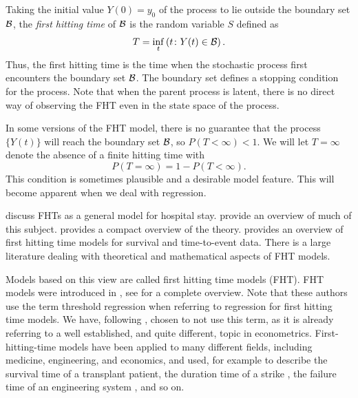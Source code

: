 Taking the initial value $Y(0)=y_0$ of the process to lie outside the boundary set $\mathcal{B}$, the \textit{first hitting time} of $\mathcal{B}$ is the random variable $S$ defined as
\begin{equation}\label{eq:fht-t}
    T=\inf_t\left(t\colon Y(t)\in\mathcal{B}\right).
\end{equation}
Thus, the first hitting time is the time when the stochastic process first encounters the boundary set $\mathcal{B}$. The boundary set defines a stopping condition for the process. Note that when the parent process is latent, there is no direct way of observing the FHT even in the state space of the process.

In some versions of the FHT model, there is no guarantee that the process $\{Y(t)\}$ will reach the boundary set $\mathcal{B}$, so $P(T<\infty)<1$. We will let $T=\infty$ denote the absence of a finite hitting time with
\begin{equation}
    P(T=\infty)=1-P(T<\infty).
\end{equation}
This condition is sometimes plausible and a desirable model feature. This will become apparent when we deal with regression.

\citet{eaton-whitmore} discuss FHTs as a general model for hospital stay. \citet{aalengjessing2001} provide an overview of much of this subject. \citet{lawless2011} provides a compact overview of the theory. \citet{leewhitmore2004a} provides an overview of first hitting time models for survival and time-to-event data. There is a large literature dealing with theoretical and mathematical aspects of FHT models.

Models based on this view are called first hitting time models (FHT). FHT models were introduced in \citet{whitmore1986}, see \citet{leewhitmore2006} for a complete overview. Note that these authors use the term threshold regression when referring to regression for first hitting time models. We have, following \citet{caroni2017}, chosen to not use this term, as it is already referring to a well established, and quite different, topic in econometrics. First-hitting-time models have been applied to many different fields, including medicine, engineering, and economics, and used, for example to describe the survival time of a transplant patient, the duration time of a strike \citep{lancaster}, the failure time of an engineering system , and so on.

